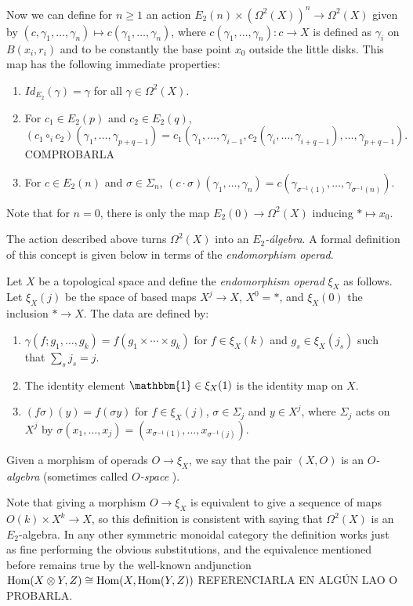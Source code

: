 \documentclass[TFM.tex]{subfiles}
\begin{document}
Now we can define for $n\geq 1$ an action $E_2(n)\times (\Omega^2(X))^n\to \Omega^2(X)$ given by $(c,\gamma_1,\dots, \gamma_n)\mapsto c(\gamma_1,\dots, \gamma_n)$, where 
$c(\gamma_1,\dots, \gamma_n):c\to X$ is defined as $\gamma_i$ on $B(x_i,r_i)$ and to be constantly the base point $x_0$ outside the little disks. This map has the following immediate properties:
\begin{enumerate}
\item $Id_{E_2}(\gamma)=\gamma$ for all $\gamma\in \Omega^2(X)$.
\item For $c_1\in E_2(p)$ and $c_2\in E_2(q)$, 
$$(c_1\circ_i c_2)(\gamma_1,\dots, \gamma_{p+q-1})=c_1(\gamma_1,\dots, \gamma_{i-1}, c_2(\gamma_i,\dots, \gamma_{i+q-1}),\dots, \gamma_{p+q-1}).$$ COMPROBARLA
\item For $c\in E_2(n)$ and $\sigma\in\Sigma_n$, $(c\cdot \sigma)(\gamma_1,\dots,\gamma_n)=c(\gamma_{\sigma^{-1}(1)},\dots, \gamma_{\sigma^{-1}(n)})$. 
\end{enumerate}
Note that for $n=0$, there is only the map $E_2(0)\to\Omega^2(X)$ inducing $*\mapsto x_0$. 

The action described above turns $\Omega^2(X)$ into an \emph{$E_2$-álgebra}. A formal definition of this concept is given below in terms of the \emph{endomorphism operad}.


\begin{defi}
Let $X$ be a topological space and define the \emph{endomorphism operad} $\xi_X$ as follows. Let $\xi_X(j)$ be the space of based maps $X^j\to X$, $X^0=*$, and $\xi_X(0)$ the inclusion $*\to X$. The data are defined by:
\begin{enumerate}
\item $\gamma(f;g_1,\dots, g_k)=f(g_1\times\cdots\times g_k)$ for $f\in \xi_X(k)$ and $g_s\in\xi_X(j_s)$ such that $\sum_s j_s=j$.
\item The identity element $\mathbbm{1}\in\xi_X(1)$ is the identity map on $X$.
\item $(f\sigma)(y)=f(\sigma y)$ for $f\in\xi_X(j)$, $\sigma\in\Sigma_j$ and $y\in X^j$, where $\Sigma_j$ acts on $X^j$ by $\sigma(x_1,\dots, x_j)=(x_{\sigma^{-1}(1)},\dots, x_{\sigma^{-1}(j)})$. 
\end{enumerate}

Given a morphism of operads $O\to \xi_X$, we say that the pair $(X,O)$ is an \emph{$O$-algebra} (sometimes called \emph{$O$-space} \cite{May}).
\end{defi}


Note that giving a morphism $O\to \xi_X$ is equivalent to give a sequence of maps $O(k)\times X^k\to X$, so this definition is consistent with saying that $\Omega^2(X)$ is an $E_2$-algebra. In any other symmetric monoidal category the definition works just as fine performing the obvious substitutions, and the equivalence mentioned before remains true by the well-known andjunction $\operatorname{Hom}(X\otimes Y,Z)\cong\operatorname{Hom}(X,\operatorname{Hom}(Y,Z))$ REFERENCIARLA EN ALGÚN LAO O PROBARLA. 
\end{document}
